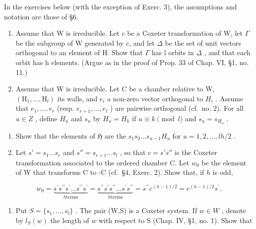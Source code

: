 
In the exercises below (with the exception of Exerc. 3), the assumptions and notation are those of §6.

\begin{enumerate}
\def\labelenumi{\arabic{enumi})}
\item
  Assume that W is irreducible. Let c be a Coxeter transformation of W, let \(\Gamma\) be the subgroup of W generated by c, and let \(\Delta\) be the set of unit vectors orthogonal to an element of H. Show that \(\Gamma\) has l orbits in \(\Delta\) , and that each orbit has h elements. (Argue as in the proof of Prop. 33 of Chap. VI, §1, no. 11.)
\item
  Assume that W is irreducible. Let C be a chamber relative to W, \((\mathrm{H}_{1},\ldots,\mathrm{H}_{l})\) its walls, and \(e_{i}\) a non-zero vector orthogonal to \(H_{i}\) . Assume that \(e_{1},\ldots,e_{r}\) (resp. \(e_{r+1},\ldots,e_{l}\) ) are pairwise orthogonal (cf.~no. 2). For all \(u\in Z\) , define \(H_{u}\) and \(s_{u}\) by \(H_{u}=H_{k}\) if \(u\equiv k\pmod{l}\) and \(s_{u}=s_{H_{u}}\) .
\end{enumerate}

\begin{enumerate}
\def\labelenumi{\alph{enumi})}
\item
  Show that the elements of \(\mathfrak{H}\) are the \(s_1 s_2 \ldots s_{u-1} H_u\) for \(u = 1, 2, \ldots, lh/2\) .
\item
  Let \(s' = s_1 \ldots s_r\) and \(s'' = s_{r+1} \ldots s_l\) , so that \(c = s's''\) is the Coxeter transformation associated to the ordered chamber C. Let \(w_0\) be the element of W that transforms C to -C (cf.~§4, Exerc. 2). Show that, if \(h\) is odd,
\end{enumerate}

\[
w _ {0} = \underbrace {s ^ {\prime} s ^ {\prime \prime} s ^ {\prime} \ldots s ^ {\prime \prime} s ^ {\prime}} _ {h \text {terms}} = \underbrace {s ^ {\prime \prime} s ^ {\prime} s ^ {\prime \prime} \ldots s ^ {\prime} s ^ {\prime \prime}} _ {h \text {terms}} = s ^ {\prime \prime} c ^ {(h - 1) / 2} = c ^ {(h - 1) / 2} s ^ {\prime}.
\]

\begin{enumerate}
\def\labelenumi{\alph{enumi})}
\setcounter{enumi}{2}
\tightlist
\item
  Put \(S = \{s_1, \ldots, s_l\}\) . The pair (W,S) is a Coxeter system. If \(w \in W\) , denote by \(l_S(w)\) the length of \(w\) with respect to S (Chap. IV, §1, no. 1). Show that
\end{enumerate}

